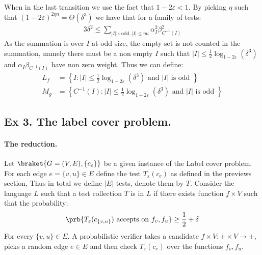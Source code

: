 \documentclass{article}
\begin{document}
 When in the last transition we use the fact that $1-2\varepsilon < 1$. By picking $\eta$ such that $(1-2\varepsilon)^{2\eta n } = \Theta\left( \delta^{3} \right)$ we have that for a family of tests:   
 \begin{equation}
   \label{equ:we}
   \begin{split}
     3\delta^{2} \le  \sum_{|I| \text{is odd} , |I| \le \eta n  }{\alpha_{I}^{2}\beta_{C^{-1}(I)}^{2}}
   \end{split}
 \end{equation}
 As the summation is over $I$ at odd size, the empty set is not counted in the summation, namely there must be a non empty $I$ such that $|I| \le \frac{1}{2} \log_{1-2\varepsilon}\left( \delta^{3} \right)$ and $\alpha_{I}\beta_{C^{-1}\left( I \right)}$ have non zero weight. Thus we can define: 
 \begin{equation*}
   \begin{split}
 L_{f} & = \left\{ I : |I| \le \frac{1}{2} \log_{1-2\varepsilon}\left( \delta^{3} \right) \text{ and } |I| \text{ is odd } \right\} \\
 M_{g} & = \left\{ C^{-1}(I) : |I| \le \frac{1}{2} \log_{1-2\varepsilon}\left( \delta^{3} \right) \text{ and } |I| \text{ is odd } \right\}
   \end{split}
 \end{equation*}
%
\subsection{Ex 3. The label cover problem.} 
\paragraph{The reduction.} Let $\braket{G=(V,E), \{ c_{e} \} }$ be a given instance of the Label cover problem. For each edge $e = \{v,u\} \in E$ define the test $T_{\varepsilon}\left( c_{e} \right)$ as defined in the previews section, Thus in total we define $|E|$ tests, denote them by $T$. Consider the language $L$ such that a test collection $T$ is in $L$ if there exists function $f \times V$ such that the probability:  
\begin{equation*}
  \begin{split}
    \prb{T_{\varepsilon}(c_{ \{ v,u\} }) \text{ accepts on } f_{v},f_{u} } \ge \frac{1}{2} + \delta
  \end{split}
\end{equation*}
For every $\{v, u\} \in E$. A probabilistic verifier takes a candidate $f\times V : \pm  \times V \rightarrow \pm$, picks a random edge $e \in E$ and then check $T_{\varepsilon}\left( c_{e} \right)$ over the functions $f_{v},f_{u}$.    
\end{document}
